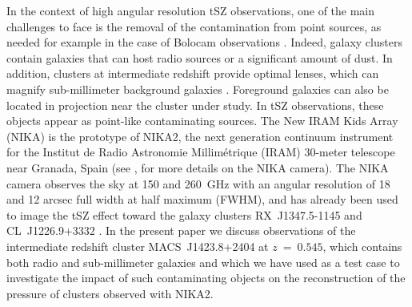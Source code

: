 \documentclass[traditabstract]{aa}
\begin{document}
In the context of high angular resolution tSZ observations, one of the main challenges to face is the removal of the contamination from point sources, as needed for example in the case of Bolocam observations \citep{sayers2013a}. Indeed, galaxy clusters contain galaxies that can host radio sources or a significant amount of dust. In addition, clusters at intermediate redshift provide optimal lenses, which can magnify sub-millimeter background galaxies \citep[see, e.g.,][]{adam2014}. Foreground galaxies can also be located in projection near the cluster under study. In tSZ observations, these objects appear as point-like contaminating sources.  The New IRAM Kids Array (NIKA) is the prototype of NIKA2, the next generation continuum instrument for the Institut de Radio Astronomie Millim\'etrique (IRAM) 30-meter telescope near Granada, Spain (see \citealt{monfardini2010,bourion2011,bourrion2012,monfardini2011,calvo2012,catalano2014}, for more details on the NIKA camera). The NIKA camera observes the sky at 150 and 260~GHz with an angular resolution of 18 and 12 arcsec full width at half maximum (FWHM), and has already been used to image the tSZ effect toward the galaxy clusters \mbox{RX~J1347.5-1145} and \mbox{CL~J1226.9+3332} \citep[see][]{adam2013,adam2014}. In the present paper we discuss observations of  the intermediate redshift cluster \mbox{MACS~J1423.8+2404} at $z~=~0.545$, which contains both radio and sub-millimeter galaxies and which we have used as a test case to investigate the impact of such contaminating objects on the reconstruction of the pressure of clusters observed with NIKA2. 
\end{document}
